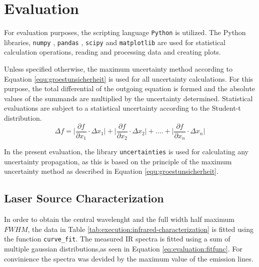 \section{Evaluation}
\label{sec:evaluation}

For evaluation purposes, the scripting language \verb|Python| \cite{PYTHON} is utilized.
The Python libraries, \verb|numpy| \cite{harris2020array}, \verb|pandas| \cite{reback2020pandas}, \verb|scipy| \cite{2020SciPy-NMeth} and \verb|matplotlib| \cite{Hunter:2007} are used for statistical calculation operations, reading and processing data and creating plots.

Unless specified otherwise, the maximum uncertainty method according to Equation \ref{equ:groestunsicherheit} \cite{MMETH} is used for all uncertainty calculations.
For this purpose, the total differential of the outgoing equation is formed and the absolute values of the summands are multiplied by the uncertainty determined.
Statistical evaluations are subject to a statistical uncertainty according to the Student-t distribution.
\begin{equation}
    \varDelta f = \biggl| \frac{\partial f}{\partial x_{1}} \cdot \varDelta x_{1} \biggl| + \biggl| \frac{\partial f}{\partial x_{2}} \cdot \varDelta x_{2} \biggl| + .... + \biggl| \frac{\partial f}{\partial x_{n}} \cdot \varDelta x_{n} \biggl|
    \label{equ:groestunsicherheit}
\end{equation}

In the present evaluation, the library \verb|uncertainties| \cite{UN} is used for calculating any uncertainty propagation, as this is based on the principle of the maximum uncertainty method as described in Equation \ref{equ:groestunsicherheit}.

\subsection{Laser Source Characterization}
In order to obtain the central wavelenght and the full width half maximum $FWHM$, the data in Table \ref{tab:execution:infrared-characterization} is fitted using the function \verb|curve_fit|.
The measured IR spectra is fitted using a sum of multiple gaussian distributions,as seen in Equation \ref{eq:evaluation:fitfunc}.
For convinience the spectra was devided by the maximum value of the emission lines. 

